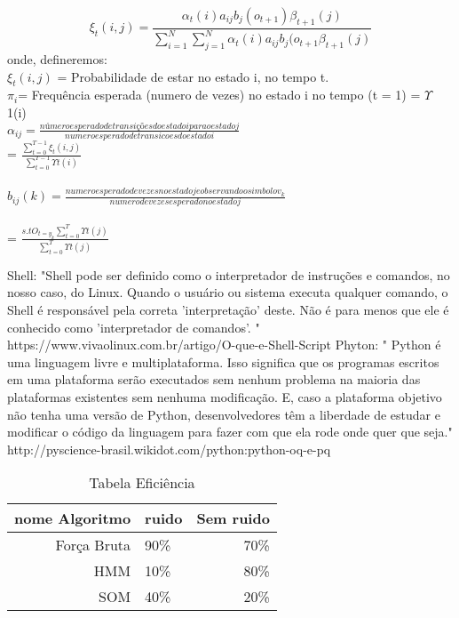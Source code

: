 \begin{equation}
 \xi_t (i,j) = \frac {\alpha _t (i) a_{ij} b_{j} (o_{t+1}) \beta _{t+1}(j)} {\sum\limits_{ i = 1}^{N} \sum\limits_{ j = 1}^{N} \alpha _{t} (i) a_{ij} b_{j} (o_{t+1} \beta _{t+1} (j)}
\end{equation}
 onde, defineremos:\\

$ \xi_t (i,j)$ = Probabilidade de estar no estado i, no tempo t.\\
$ \pi _{i} $= Frequência esperada (numero de vezes) no estado i no tempo (t = 1) =  $\Upsilon$ 1(i) \\

$ \alpha _{ij}= \frac {número  esperado de transições do estado i para o estado j} {numero esperado  de transicoes do estado i} $\\
        
                     = $ \frac {\sum\limits_{ t = 0}^{T- 1}\xi_t (i,j) } { \sum\limits_{ t = 0}^{T - 1} \Upsilon t(i)} $\\  
\\
$ b _{ij} (k) = \frac {numero esperado de vezes no estado j e observando o simbolo v_{k}} {numero de vezes esperado no estado j}  $ \\
\\
	         = $\frac {s.t O _{t=y_{k}}  \sum\limits_{ t = 0}^{T}  \Upsilon t(j)}{\sum\limits_{ t = 0}^{T}\Upsilon t(j)}$

\quad 
Shell: "Shell pode ser definido como o interpretador de instruções e comandos, no nosso caso, do Linux. Quando o usuário ou sistema executa qualquer comando, o Shell é responsável pela correta 'interpretação' deste. Não é para menos que ele é conhecido como 'interpretador de comandos'. "
\quad https://www.vivaolinux.com.br/artigo/O-que-e-Shell-Script
\quad 
\quad Phyton: " Python é uma linguagem livre e multiplataforma. Isso significa que os programas escritos em uma plataforma serão executados sem nenhum problema na maioria das plataformas existentes sem nenhuma modificação. E, caso a plataforma objetivo não tenha uma versão de Python, desenvolvedores têm a liberdade de estudar e modificar o código da linguagem para fazer com que ela rode onde quer que seja."
\quad http://pyscience-brasil.wikidot.com/python:python-oq-e-pq
\quad 
\begin{table}[h]
\caption {Tabela Eficiência}
\begin {tabular}{r|lr}
nome Algoritmo & ruido & Sem ruido\\

\hline Força Bruta & 90\%&70\%\\
\hline HMM &10\% &80\%\\
\hline SOM &40\%&20\%\\
\end {tabular}
\end{table}











